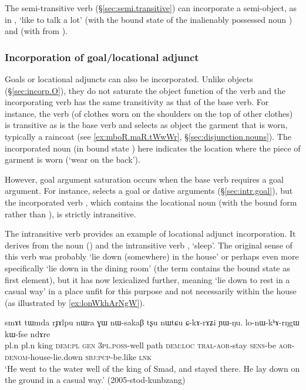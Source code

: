 The semi-transitive verb  (§\ref{sec:semi.transitive}) can incorporate a semi-object, as in , `like to talk a lot' (with the bound state  of the inalienably possessed noun ) and  (with  from ).

 
\subsubsection{Incorporation of goal/locational adjunct} \label{sec:incorp.goal}
Goals or locational adjuncts can also be incorporated. Unlike objects (§\ref{sec:incorp.O}), they do not saturate the object function of the verb and the incorporating verb has the same transitivity as that of the base verb. For instance, the verb  (of clothes worn on the shoulders on the top of other clothes) is transitive as is the base verb  and selects as object the garment that is worn, typically a raincoat  (see \ref{ex:mboR.maR.tWwWr}, §\ref{sec:disjunction.nouns}). The incorporated noun  (in bound state ) here indicates the location where the piece of garment is worn (`wear on the back').

However, goal argument saturation occurs when the base verb requires a goal argument. For instance,  selects a goal or dative arguments (§\ref{sec:intr.goal}), but the incorporated verb , which contains the locational noun  (with the bound form  rather than ), is strictly intransitive.

The intransitive verb  provides an example of locational adjunct incorporation.  It derives from the noun   () and the intransitive verb , `sleep'. The original sense of this verb was probably `lie down (somewhere) in the house' or perhaps even more specifically  `lie down in the dining room' (the term  contains the bound state  as first element), but it has now lexicalized further, meaning `lie down to rest in a casual way' in a place unfit for this purpose and not necessarily within the house (as illustrated by \ref{ex:lonWkhArNgW}).

\begin{exe}
\ex \label{ex:lonWkhArNgW}
\gll  smɤt tɯmda rɟɤlpu nɯra ɣɯ nɯ-sakaβ tʂu nɯtɕu ɕ-kɤ-rɤʑi ɲɯ-ŋu.  lo-nɯ-kʰɤ-rŋgɯ kɯ-fse ndɤre \\
pl.n pl.n king \textsc{dem}:\textsc{pl} \textsc{gen} \textsc{3pl}.\textsc{poss}-well path \textsc{dem}:\textsc{loc} \textsc{tral}-\textsc{aor}-stay \textsc{sens}-be \textsc{aor}-\textsc{denom}-house-lie.down \textsc{sbj}:\textsc{pcp}-be.like \textsc{lnk} \\
\glt `He went to the water well of the king of Smad, and stayed there. He lay down on the ground in a casual way.' (2005-stod-kunbzang)
\end{exe}

